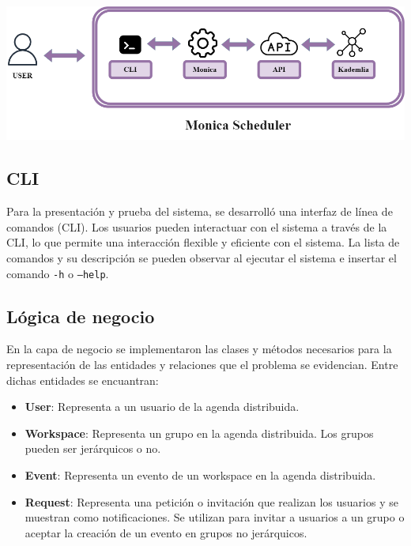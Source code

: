 \documentclass[10pt]{article} %
\begin{document}
	\begin{center}
		\includegraphics[scale=0.4]{esquema}
	\end{center}
	
	\subsection{CLI}
	
	Para la presentación y prueba del sistema, se desarrolló una interfaz de línea de comandos (CLI). Los usuarios pueden interactuar con el sistema a través de la CLI, lo que permite una interacción flexible y eficiente con el sistema. La lista de comandos y su descripci\'on se pueden observar al ejecutar el sistema e insertar el comando \texttt{-h} o \texttt{--help}.
	
	\subsection{L\'ogica de negocio}
	
	En la capa de negocio se implementaron las clases y m\'etodos necesarios para la representaci\'on de las entidades y relaciones que el problema se evidencian. Entre dichas entidades se encuantran:
	\begin{itemize}
		\item \textbf{User}: Representa a un usuario de la agenda distribuida.
		\item \textbf{Workspace}: Representa un grupo en la agenda distribuida. Los grupos pueden ser jer\'arquicos o no.
		\item \textbf{Event}: Representa un evento de un workspace en la agenda distribuida.
		\item \textbf{Request}: Representa una petici\'on o invitaci\'on que realizan los usuarios y se muestran como notificaciones. Se utilizan para invitar a usuarios a un grupo o aceptar la creaci\'on de un evento en grupos no jer\'arquicos.
	\end{itemize}
\end{document}
